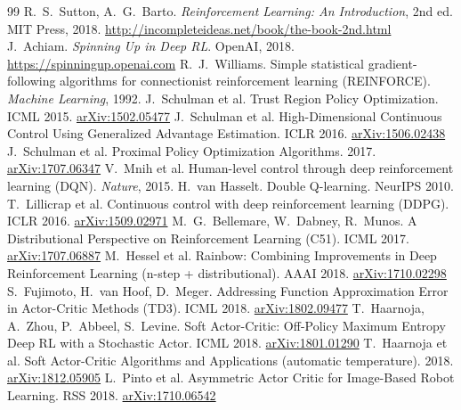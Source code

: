 \documentclass[10pt,letterpaper]{article}
\begin{document}
\begin{thebibliography}{99}\small
\setlength{\itemsep}{1pt}
 R.~S.~Sutton, A.~G.~Barto. \emph{Reinforcement Learning: An Introduction}, 2nd ed. MIT Press, 2018. \url{http://incompleteideas.net/book/the-book-2nd.html}
 J.~Achiam. \emph{Spinning Up in Deep RL}. OpenAI, 2018. \url{https://spinningup.openai.com}
 R.~J.~Williams. Simple statistical gradient-following algorithms for connectionist reinforcement learning (REINFORCE). \emph{Machine Learning}, 1992.
 J.~Schulman et al. Trust Region Policy Optimization. ICML 2015. \href{https://arxiv.org/abs/1502.05477}{arXiv:1502.05477}
 J.~Schulman et al. High-Dimensional Continuous Control Using Generalized Advantage Estimation. ICLR 2016. \href{https://arxiv.org/abs/1506.02438}{arXiv:1506.02438}
 J.~Schulman et al. Proximal Policy Optimization Algorithms. 2017. \href{https://arxiv.org/abs/1707.06347}{arXiv:1707.06347}
 V.~Mnih et al. Human-level control through deep reinforcement learning (DQN). \emph{Nature}, 2015.
 H.~van Hasselt. Double Q-learning. NeurIPS 2010.
 T.~Lillicrap et al. Continuous control with deep reinforcement learning (DDPG). ICLR 2016. \href{https://arxiv.org/abs/1509.02971}{arXiv:1509.02971}
 M.~G.~Bellemare, W.~Dabney, R.~Munos. A Distributional Perspective on Reinforcement Learning (C51). ICML 2017. \href{https://arxiv.org/abs/1707.06887}{arXiv:1707.06887}
 M.~Hessel et al. Rainbow: Combining Improvements in Deep Reinforcement Learning (n-step + distributional). AAAI 2018. \href{https://arxiv.org/abs/1710.02298}{arXiv:1710.02298}
 S.~Fujimoto, H.~van Hoof, D.~Meger. Addressing Function Approximation Error in Actor-Critic Methods (TD3). ICML 2018. \href{https://arxiv.org/abs/1802.09477}{arXiv:1802.09477}
 T.~Haarnoja, A.~Zhou, P.~Abbeel, S.~Levine. Soft Actor-Critic: Off-Policy Maximum Entropy Deep RL with a Stochastic Actor. ICML 2018. \href{https://arxiv.org/abs/1801.01290}{arXiv:1801.01290}
 T.~Haarnoja et al. Soft Actor-Critic Algorithms and Applications (automatic temperature). 2018. \href{https://arxiv.org/abs/1812.05905}{arXiv:1812.05905}
 L.~Pinto et al. Asymmetric Actor Critic for Image-Based Robot Learning. RSS 2018. \href{https://arxiv.org/abs/1710.06542}{arXiv:1710.06542}

\end{thebibliography}
\end{document}
